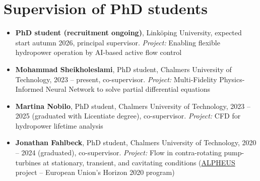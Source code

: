 \newpage
\section{Supervision of PhD students}{}

\begin{itemize}[leftmargin=*,topsep=5pt]
    \item{\textbf{\small PhD student (recruitment ongoing)}, Linköping University, expected start autumn 2026, principal supervisor. \textit{Project:} Enabling flexible hydropower operation by AI-based active flow control%
    }

    \item{\textbf{Mohammad Sheikholeslami}, PhD student, Chalmers University of Technology, 2023 -- present, co-supervisor. \textit{Project:} Multi-Fidelity Physics-Informed Neural Network to solve partial differential equations}

    \item{\textbf{Martina Nobilo}, PhD student, Chalmers University of Technology, 2023 -- 2025 (graduated with Licentiate degree), co-supervisor. \textit{Project:} CFD for hydropower lifetime analysis}

    \item{\textbf{Jonathan Fahlbeck}, PhD student, Chalmers University of Technology, 2020 -- 2024 (graduated), co-supervisor. \textit{Project:} Flow in contra-rotating pump-turbines at stationary, transient, and cavitating conditions (\href{https://alpheus-h2020.eu/}{ALPHEUS} project -- European Union’s Horizon 2020 program)}

\end{itemize}
